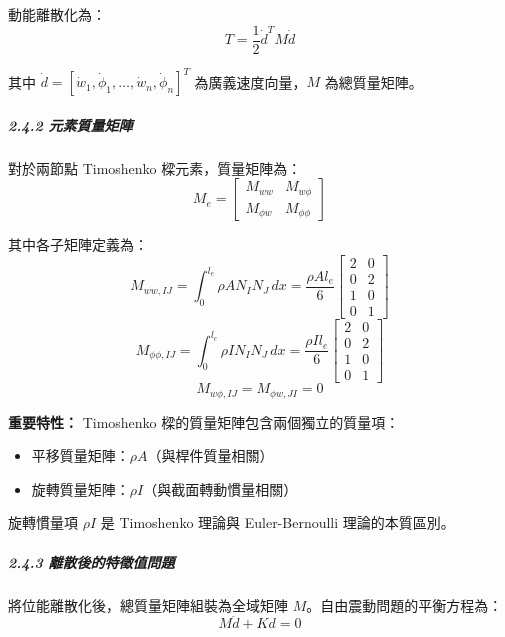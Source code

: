 \documentclass[UTF8, a4paper, 12pt]{ctexart}
\begin{document}
動能離散化為：
\begin{equation}
  T = \frac{1}{2} \dot{d}^T M \dot{d}
\end{equation}

其中 $\dot{d} = [\dot{w}_1, \dot{\phi}_1, \dots, \dot{w}_n, \dot{\phi}_n]^T$ 為廣義速度向量，$M$ 為總質量矩陣。

\subparagraph{2.4.2 元素質量矩陣}

對於兩節點 Timoshenko 樑元素，質量矩陣為：
\begin{equation}
  M_e = 
  \begin{bmatrix}
    M_{ww} & M_{w\phi} \\
    M_{\phi w} & M_{\phi\phi}
  \end{bmatrix}
\end{equation}

其中各子矩陣定義為：
\begin{equation}
  M_{ww,IJ} = \int_0^{l_e} \rho A N_I N_J \, dx = \frac{\rho A l_e}{6}
  \begin{bmatrix}
    2 & 0 \\
    0 & 2 \\
    1 & 0 \\
    0 & 1
  \end{bmatrix}
\end{equation}
\begin{equation}
  M_{\phi\phi,IJ} = \int_0^{l_e} \rho I N_I N_J \, dx = \frac{\rho I l_e}{6}
  \begin{bmatrix}
    2 & 0 \\
    0 & 2 \\
    1 & 0 \\
    0 & 1
  \end{bmatrix}
\end{equation}
\begin{equation}
  M_{w\phi,IJ} = M_{\phi w,JI} = 0
\end{equation}

\textbf{重要特性：} Timoshenko 樑的質量矩陣包含兩個獨立的質量項：
\begin{itemize}
  \item 平移質量矩陣：$\rho A$（與桿件質量相關）
  \item 旋轉質量矩陣：$\rho I$（與截面轉動慣量相關）
\end{itemize}

旋轉慣量項 $\rho I$ 是 Timoshenko 理論與 Euler-Bernoulli 理論的本質區別。

\subparagraph{2.4.3 離散後的特徵值問題}

將位能離散化後，總質量矩陣組裝為全域矩陣 $M$。自由震動問題的平衡方程為：
\begin{equation}
  M \ddot{d} + K d = 0
\end{equation}
\end{document}
